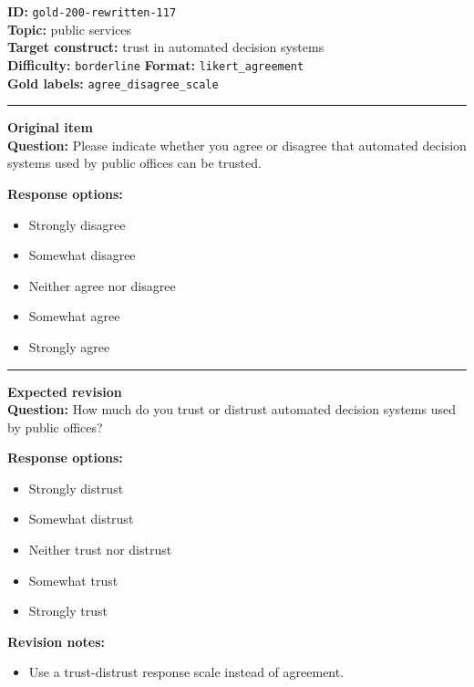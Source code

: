 \documentclass[10pt,a4paper]{article}
\newcommand{\sectionline}{\vspace{0.15em}\hrule\vspace{0.35em}}
\begin{document}
\begin{tcolorbox}[colframe=FlawRed,colback=white,colbacktitle=FlawRed!9,coltitle=black,title={Item 117\hfill Flawed item}]
\textbf{ID:} \texttt{gold-200-rewritten-117}\\
\textbf{Topic:} public services\\
\textbf{Target construct:} trust in automated decision systems\\
\textbf{Difficulty:} \texttt{borderline} \quad \textbf{Format:} \texttt{likert\_agreement}\\
\textbf{Gold labels:} \texttt{agree\_disagree\_scale}\\
\sectionline
\textbf{Original item}\\
\textbf{Question:} Please indicate whether you agree or disagree that automated decision systems used by public offices can be trusted.
\par\textbf{Response options:}
\begin{itemize}
\item Strongly disagree
\item Somewhat disagree
\item Neither agree nor disagree
\item Somewhat agree
\item Strongly agree
\end{itemize}
\sectionline
\textbf{Expected revision}\\
\textbf{Question:} How much do you trust or distrust automated decision systems used by public offices?
\par\textbf{Response options:}
\begin{itemize}
\item Strongly distrust
\item Somewhat distrust
\item Neither trust nor distrust
\item Somewhat trust
\item Strongly trust
\end{itemize}
\par\textbf{Revision notes:}
\begin{itemize}
\item Use a trust-distrust response scale instead of agreement.
\end{itemize}
\end{tcolorbox}
\end{document}
